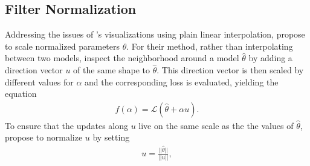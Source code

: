 \documentclass[a4paper]{scrartcl}
\begin{document}
\label{subs:filter}
\subsection*{Filter Normalization}
Addressing the issues of \cite{goodfellow2014qualitatively}'s visualizations using plain linear interpolation, \cite{li2017visualizing} propose to scale normalized parameters $\theta$. For their method, rather than interpolating between two models, inspect the neighborhood around a model $\hat{\theta}$ by adding a direction vector $u$  of the same shape to $\hat{\theta}$. This direction vector is then scaled by different values for $\alpha$ and the corresponding loss is evaluated, yielding the equation
\begin{align*}
	f(\alpha) = \mathcal{L}(\hat{\theta} + \alpha u).
\end{align*}
To ensure that the updates along $u$ live on the same scale as the the values of $\hat{\theta}$, \cite{li2017visualizing} propose to normalize $u$ by setting
\begin{align}
	u = \frac{||\hat{\theta}||}{||u||},
\end{align}
\end{document}
